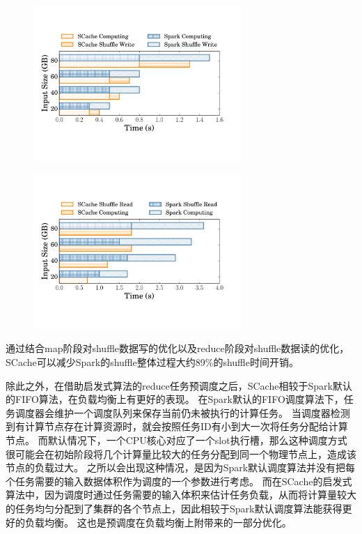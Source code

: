 \begin{figure}[!htp]
	\centering
	\includegraphics[width=0.7\textwidth]{../../PPoPP-2018/fig/groupbymaptask.pdf}
\end{figure}

\begin{figure}[!htp]
	\centering
	\includegraphics[width=0.7\textwidth]{../../PPoPP-2018/fig/groupbyreducetask.pdf}
\end{figure}


通过结合map阶段对shuffle数据写的优化以及reduce阶段对shuffle数据读的优化，SCache可以减少Spark的shuffle整体过程大约89\%的shuffle时间开销。

除此之外，在借助启发式算法的reduce任务预调度之后，SCache相较于Spark默认的FIFO算法，在负载均衡上有更好的表现。
在Spark默认的FIFO调度算法下，任务调度器会维护一个调度队列来保存当前仍未被执行的计算任务。
当调度器检测到有计算节点存在计算资源时，就会按照任务ID有小到大一次将任务分配给计算节点。
而默认情况下，一个CPU核心对应了一个slot执行槽，那么这种调度方式很可能会在初始阶段将几个计算量比较大的任务分配到同一个物理节点上，造成该节点的负载过大。
之所以会出现这种情况，是因为Spark默认调度算法并没有把每个任务需要的输入数据体积作为调度的一个参数进行考虑。
而在SCache的启发式算法中，因为调度时通过任务需要的输入体积来估计任务负载，从而将计算量较大的任务均匀分配到了集群的各个节点上，因此相较于Spark默认调度算法能获得更好的负载均衡。
这也是预调度在负载均衡上附带来的一部分优化。

